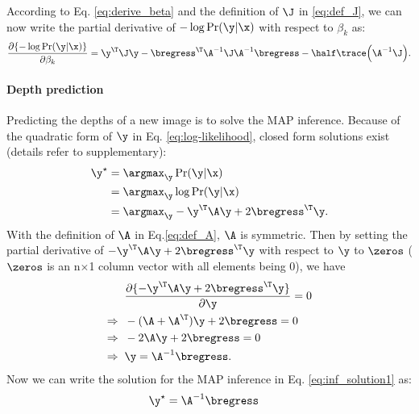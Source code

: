 According to Eq. \eqref{eq:derive_beta} and the definition of  $\J$ in \eqref{eq:def_J}, we can now write the partial derivative of $-\log\Pr(\y|\x)$ with respect to $\beta_k$  as:
\begin{equation}  \label{eq:derive_beta_final}
\frac{\partial \{ -\log\Pr(\y|\x)\} }{\partial \beta_k} =  \y^{\T} \J \y - \bregress^{\T} \A^{-1} \J \A^{-1}\bregress - \half \trace \Big( \A^{-1} \J \Big).
\end{equation}

\paragraph{Depth prediction}
Predicting the depths of a new image is to solve the MAP inference.
Because of the quadratic form of $\y$ in Eq. \eqref{eq:log-likelihood}, closed form solutions exist (details refer to supplementary): %
\begin{align} \label{eq:inf_solution1}
\y^{\star}&=\argmax_{\y} \Pr(\y|\x)  \notag \\
&=\argmax_{\y} \log \Pr(\y|\x) \notag   \\
&= \argmax_{\y} -\y^\T \A \y + 2\bregress^\T \y .
\end{align}
With the definition of $\A$ in Eq.\eqref{eq:def_A}, $\A$ is symmetric.
Then by setting the partial derivative of $-\y^\T \A \y + 2\bregress^\T \y$ with respect to $\y$ to $\zeros$ ($\zeros$ is an n$\times$1 column vector with all elements being 0), we have
\begin{align} \label{eq:inf_deriv}
&\frac{\partial \{ -\y^\T \A \y + 2\bregress^\T \y \} } {\partial \y} =0  \notag  \\
\Rightarrow \;\;&-(\A + \A^{\T} ) \y +2 \bregress=0  \notag  \\
\Rightarrow \;\;&-2\A \y +2 \bregress=0  \notag  \\
\Rightarrow \;\;&\y = \A^{-1} \bregress.
\end{align}
Now we can write the solution for the MAP inference in Eq. \eqref{eq:inf_solution1} as:
\begin{align} \label{eq:inf_solution2}
\y^{\star}&= \A^{-1} \bregress
\end{align}

